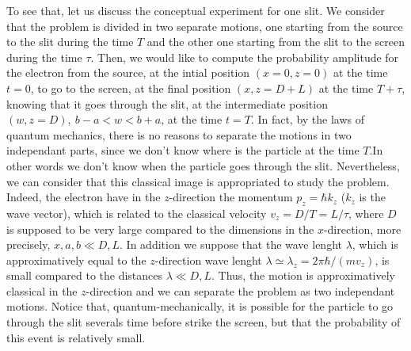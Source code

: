 \documentclass[12pt]{article}   %
\begin{document}
To see that, let us discuss the conceptual experiment for one slit.\cite{FH} 
We consider that the problem is divided 
in two separate motions, one starting from the source to the slit during the time $T$
and the other one starting from the slit to the screen during the time $\tau$. 
Then, we would like to compute the probability amplitude for the electron
from the source, at the intial position $(x=0,z=0)$ at the time $t=0$, 
to go to the screen, at the final position $(x,z=D+L)$ at the time $T+\tau$, 
knowing that it goes through the slit, 
at the intermediate position $(w,z=D),\ b-a<w<b+a$, at the time $t=T$. 
In fact, by the laws of quantum mechanics, there is no reasons
to separate the motions in two independant parts, since we don't know
where is the particle at the time $T$.In other words we don't
know when the particle goes through the slit.
Nevertheless, we can consider that this classical image is appropriated
to study the problem. Indeed, the electron have in the $z$-direction 
the momentum $p_z=\hbar k_z$ ($k_z$ is the wave vector), 
which is related to the classical velocity $v_z=D/T=L/\tau$, 
where $D$ is supposed to be very large compared to the dimensions in the $x$-direction,
more precisely, $x,a,b\ll D,L$. In addition we suppose that the wave lenght $\lambda$, 
which is approximatively equal to the $z$-direction wave lenght $\lambda\simeq\lambda_z=2\pi\hbar/(mv_z)$, 
is small compared to the distances $\lambda\ll D,L$. 
Thus, the motion is approximatively classical in the $z$-direction 
and we can separate the problem as two independant motions.
Notice that, quantum-mechanically, it is possible for the particle to go through the slit 
severals time before strike the screen,\cite{Yabuki}
but that the probability of this event is relatively small. 
\end{document}
